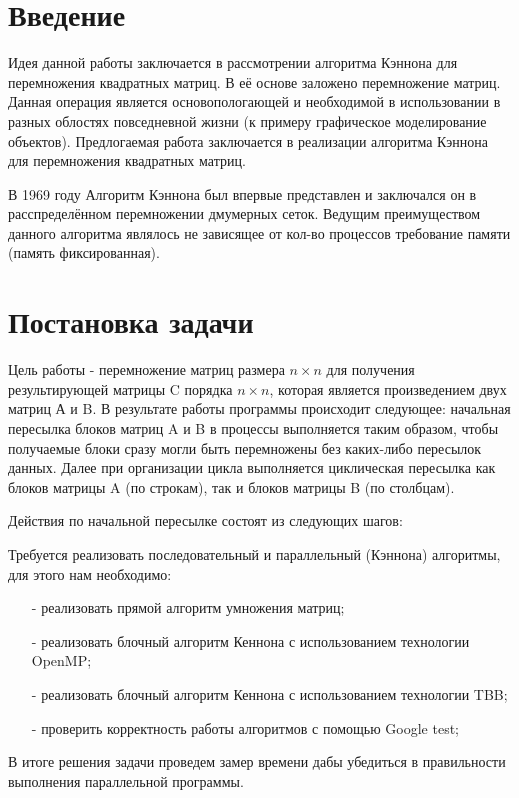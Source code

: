 \documentclass{report}
\begin{document}
\setcounter{page}{2}

\tableofcontents
\newpage

\section*{Введение}
Идея данной работы заключается в рассмотрении алгоритма Кэннона для перемножения квадратных матриц. В её основе заложено перемножение матриц. Данная операция является основопологающей и необходимой в использовании в разных облостях повседневной жизни (к примеру графическое моделирование объектов). Предлогаемая работа заключается в реализации алгоритма Кэннона для перемножения квадратных матриц.
\par В 1969 году Алгоритм Кэннона был впервые представлен и заключался он в расспределённом перемножении дмумерных сеток. Ведущим преимуществом данного алгоритма являлось не зависящее от кол-во процессов требование памяти (память фиксированная).
\newpage

\section*{Постановка задачи}
Цель работы - перемножение матриц размера {\itshape $n \times n$} для получения результирующей матрицы C порядка {\itshape $n \times n$}, которая является произведением двух матриц А и B.
В результате работы программы происходит следующее: начальная пересылка блоков матриц A и B в процессы выполняется таким образом, чтобы получаемые блоки сразу могли быть перемножены без каких-либо пересылок данных. Далее при организации цикла выполняется циклическая пересылка как блоков матрицы A (по строкам), так и блоков матрицы B (по столбцам).

Действия по начальной пересылке состоят из следующих шагов:



\par Требуется реализовать последовательный и параллельный (Кэннона) алгоритмы, для этого нам необходимо:

\begin{itemize}
    \item[-] реализовать прямой алгоритм умножения матриц;
    \item[-] реализовать блочный алгоритм Кеннона с использованием технологии OpenMP;
    \item[-] реализовать блочный алгоритм Кеннона с использованием технологии TBB;
    \item[-] проверить корректность работы алгоритмов с помощью Google test;
\end{itemize}
\par В итоге решения задачи проведем замер времени дабы убедиться в правильности выполнения параллельной программы.
\newpage
\end{document}
